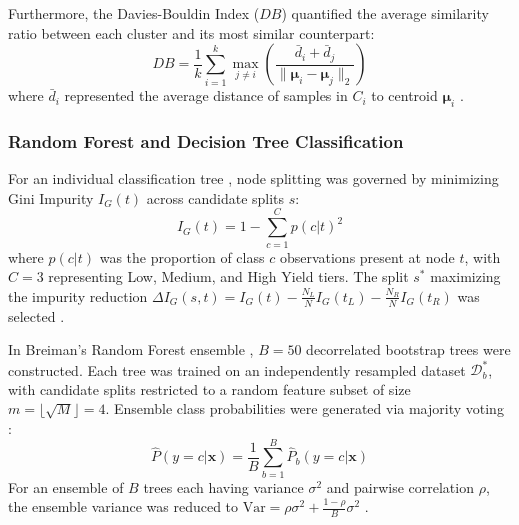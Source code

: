 \documentclass[conference]{IEEEtran}
\begin{document}
Furthermore, the Davies-Bouldin Index ($DB$) \cite{davies1979} quantified the average similarity ratio between each cluster and its most similar counterpart:
\begin{equation}
DB = \frac{1}{k} \sum_{i=1}^k \max_{j \ne i} \left( \frac{\bar{d}_i + \bar{d}_j}{\|\boldsymbol{\mu}_i - \boldsymbol{\mu}_j\|_2} \right)
\end{equation}
where $\bar{d}_i$ represented the average distance of samples in $C_i$ to centroid $\boldsymbol{\mu}_i$ \cite{davies1979}.

\subsubsection{Random Forest and Decision Tree Classification}
For an individual classification tree \cite{quinlan1986}, node splitting was governed by minimizing Gini Impurity $I_G(t)$ across candidate splits $s$:
\begin{equation}
I_G(t) = 1 - \sum_{c=1}^C p(c|t)^2
\end{equation}
where $p(c|t)$ was the proportion of class $c$ observations present at node $t$, with $C=3$ representing Low, Medium, and High Yield tiers. The split $s^*$ maximizing the impurity reduction $\Delta I_G(s, t) = I_G(t) - \frac{N_L}{N} I_G(t_L) - \frac{N_R}{N} I_G(t_R)$ was selected \cite{quinlan1986}.

In Breiman's Random Forest ensemble \cite{breiman2001}, $B=50$ decorrelated bootstrap trees were constructed. Each tree was trained on an independently resampled dataset $\mathcal{D}_b^*$, with candidate splits restricted to a random feature subset of size $m = \lfloor\sqrt{M}\rfloor = 4$. Ensemble class probabilities were generated via majority voting \cite{breiman2001}:
\begin{equation}
\hat{P}(y = c | \mathbf{x}) = \frac{1}{B} \sum_{b=1}^B \hat{P}_b(y = c | \mathbf{x})
\end{equation}
For an ensemble of $B$ trees each having variance $\sigma^2$ and pairwise correlation $\rho$, the ensemble variance was reduced to $\text{Var} = \rho \sigma^2 + \frac{1-\rho}{B}\sigma^2$ \cite{breiman2001, hastie2009}.
\end{document}
